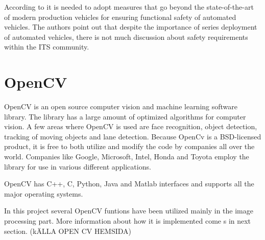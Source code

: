 According to \cite{stolte2016safety} it is needed to adopt measures that go beyond the state-of-the-art of modern production vehicles for ensuring functional safety of automated vehicles. The authors point out that despite the importance of series deployment of automated vehicles, there is not much discussion about safety requirements within the ITS community. 



\section{OpenCV}
OpenCV is an open source computer vision and machine learning software library. The library has a large amount of optimized algorithms for computer vision. A few areas where OpenCV is used are face recognition, object detection, tracking of moving objects and lane detection. Because OpenCv is a BSD-licensed product, it is free to both utilize and modify the code by companies all over the world. Companies like Google, Microsoft, Intel, Honda and Toyota employ the library for use in various different applications.

OpenCV has C++, C, Python, Java and Matlab interfaces and supports all the major operating systems.

In this project several OpenCV funtions have been utilized mainly in the image processing part. More information about how it is implemented come s in next section. (kÄLLA OPEN CV HEMSIDA)